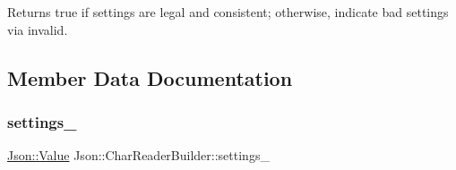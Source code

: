 \begin{DoxyReturn}{Returns}
true if \textquotesingle{}settings\textquotesingle{} are legal and consistent; otherwise, indicate bad settings via \textquotesingle{}invalid\textquotesingle{}. 
\end{DoxyReturn}


\subsection{Member Data Documentation}
\mbox{\label{classJson_1_1CharReaderBuilder_ac69b7911ad64c171c51ebaf2ea26d958}} 
\subsubsection{\texorpdfstring{settings\+\_\+}{settings\_}}
{\footnotesize\ttfamily \hyperlink{classJson_1_1Value}{Json\+::\+Value} Json\+::\+Char\+Reader\+Builder\+::settings\+\_\+}

